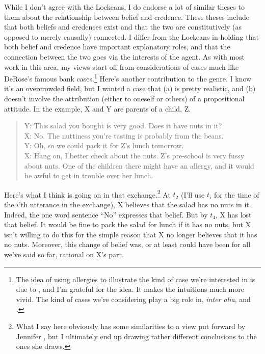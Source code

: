 While I don't agree with the Lockeans, I do endorse a lot of similar theses to them about the relationship between belief and credence. These theses include that both beliefs and credences exist and that the two are constitutively (as opposed to merely causally) connected. I differ from the Lockeans in holding that both belief and credence have important explanatory roles, and that the connection between the two goes via the interests of the agent. As with most work in this area, my views start off from considerations of cases much like DeRose's famous bank cases.\footnote{The idea of using allergies to illustrate the kind of case we're interested in is due to \cite{SchroederRoss2012}, and I'm grateful for the idea. It makes the intuitions much more vivid. The kind of cases we're considering play a big role in, \textit{inter alia}, \cite{DeRose1992, Cohen1999} and \cite{Fantl2002}.
} Here's another contribution to the genre. I know it's an overcrowded field, but I wanted a case that (a) is pretty realistic, and (b) doesn't involve the attribution (either to oneself or others) of a propositional attitude. In the example, X and Y are parents of a child, Z.

\begin{quote}
Y: This salad you bought is very good. Does it have nuts in it? \\
X: No. The nuttiness you're tasting is probably from the beans. \\
Y: Oh, so we could pack it for Z's lunch tomorrow.\\
X: Hang on, I better check about the nuts. Z's pre-school is very fussy about nuts. One of the children there might have an allergy, and it would be awful to get in trouble over her lunch.
\end{quote}

\noindent Here's what I think is going on in that exchange.\footnote{What I say here obviously has some similarities to a view put forward by Jennifer \cite{Nagel2008}, but I ultimately end up drawing rather different conclusions to the ones she draws.} At $t_2$ (I'll use $t_i$ for the time of the $i$'th utterance in the exchange), X believes that the salad has no nuts in it. Indeed, the one word sentence ``No'' expresses that belief. But by $t_4$, X has lost that belief. It would be fine to pack the salad for lunch if it has no nuts, but X isn't willing to do this for the simple reason that X no longer believes that it has no nuts. Moreover, this change of belief was, or at least could have been for all we've said so far, rational on X's part.

